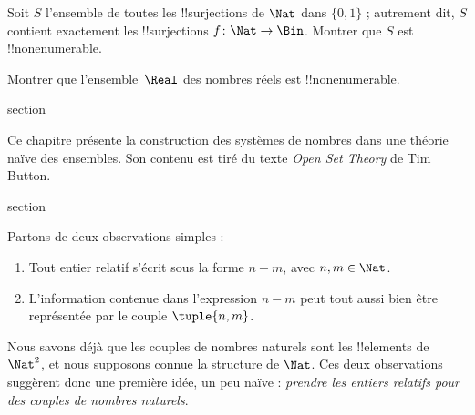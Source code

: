 \documentclass[11pt,a4paper,openany]{memoir}
\begin{document}
\begin{prob}
Soit $S$ l'ensemble de toutes les !!{surjection}s de $\Nat$ dans
$\{0,1\}$ ; autrement dit, $S$ contient exactement les
!!{surjection}s $f \colon \Nat \to \Bin$. Montrer que $S$
est !!{nonenumerable}.
\end{prob}

\begin{prob}
Montrer que l'ensemble~$\Real$ des nombres réels est !!{nonenumerable}.
\end{prob}


\endgroup


\OLEndChapterHook


\endgroup


\begingroup
\expandafter\def\csname ol@sectioncs\endcsname{section}
\def\olfilename{arithmetization}



\begin{editorial}
Ce chapitre présente la construction des systèmes de nombres dans
une théorie naïve des ensembles. Son contenu est tiré du texte
\emph{Open Set Theory} de Tim Button.
\end{editorial}


\begingroup
\expandafter\def\csname ol@sectioncs\endcsname{section}
\def\olfilename{integers}



Partons de deux observations simples :
	\begin{enumerate}
		\item Tout entier relatif s'écrit sous la forme $n - m$, avec $n, m \in\Nat$.
		\item L'information contenue dans l'expression $n - m$ peut tout aussi bien être représentée par le couple $\tuple{n, m}$.
	\end{enumerate}
Nous savons déjà que les couples de nombres naturels sont les !!{element}s de $\Nat^2$, et nous supposons connue la structure de $\Nat$. Ces deux observations suggèrent donc une première idée, un peu naïve : \emph{prendre les entiers relatifs pour des couples de nombres naturels}.
\end{document}
